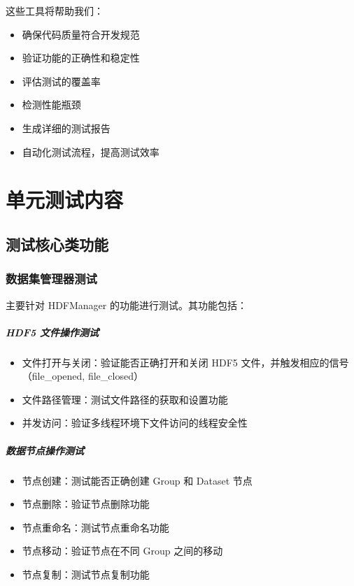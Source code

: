 \documentclass[a4paper,12pt]{report}	%
\begin{document}
这些工具将帮助我们：
\begin{itemize}
    \item 确保代码质量符合开发规范
    \item 验证功能的正确性和稳定性
    \item 评估测试的覆盖率
    \item 检测性能瓶颈
    \item 生成详细的测试报告
    \item 自动化测试流程，提高测试效率
\end{itemize}

\chapter{单元测试内容}

\section{测试核心类功能}

\subsection{数据集管理器测试}

主要针对 HDFManager 的功能进行测试。其功能包括：
\paragraph{HDF5 文件操作测试}
\begin{itemize}
    \item 文件打开与关闭：验证能否正确打开和关闭 HDF5 文件，并触发相应的信号（file\_opened, file\_closed）
    \item 文件路径管理：测试文件路径的获取和设置功能
    \item 并发访问：验证多线程环境下文件访问的线程安全性
\end{itemize}

\paragraph{数据节点操作测试}
\begin{itemize}
    \item 节点创建：测试能否正确创建 Group 和 Dataset 节点
    \item 节点删除：验证节点删除功能
    \item 节点重命名：测试节点重命名功能
    \item 节点移动：验证节点在不同 Group 之间的移动
    \item 节点复制：测试节点复制功能
\end{itemize}
\end{document}

